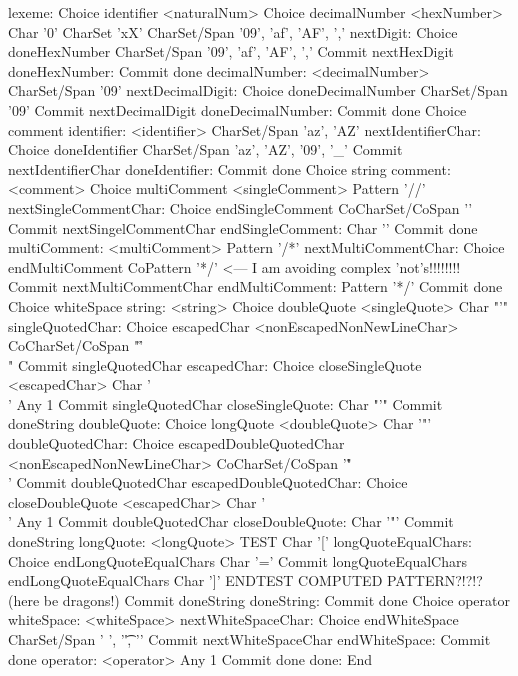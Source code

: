 \starttyping
lexeme:
  Choice identifier
    <naturalNum>
    Choice decimalNumber
      <hexNumber>
      Char '0'
      CharSet 'xX'
      CharSet/Span {'09', 'af', 'AF', ','}
    nextDigit:
      Choice doneHexNumber
      CharSet/Span {'09', 'af', 'AF', ','}
      Commit nextHexDigit
    doneHexNumber:
    Commit done
  decimalNumber:
      <decimalNumber>
      CharSet/Span '09'
    nextDecimalDigit:
      Choice doneDecimalNumber
      CharSet/Span '09'
      Commit nextDecimalDigit
    doneDecimalNumber:
    Commit done
  Choice comment
identifier:
    <identifier>
    CharSet/Span {'az', 'AZ'}
  nextIdentifierChar:
    Choice doneIdentifier
      CharSet/Span {'az', 'AZ', '09', '_'}
      Commit nextIdentifierChar
  doneIdentifier:
    Commit done
  Choice string
comment:
    <comment>
    Choice multiComment
      <singleComment>
      Pattern '//'
    nextSingleCommentChar:
      Choice endSingleComment
      CoCharSet/CoSpan '\n'
      Commit nextSingelCommentChar
    endSingleComment:
      Char '\n'
      Commit done
    multiComment:
      <multiComment>
      Pattern '/*'
    nextMultiCommentChar:
      Choice endMultiComment
      CoPattern '*/'                <--- I am avoiding complex 'not's!!!!!!!!
      Commit nextMultiCommentChar
    endMultiComment:
      Pattern '*/'
      Commit done
  Choice whiteSpace
string:
    <string>
    Choice doubleQuote
      <singleQuote>
      Char "'"
    singleQuotedChar:
      Choice escapedChar
        <nonEscapedNonNewLineChar>
        CoCharSet/CoSpan "'\r\n\f\\"
        Commit singleQuotedChar
      escapedChar:
        Choice closeSingleQuote
        <escapedChar>
        Char '\\'
        Any 1
        Commit singleQuotedChar
      closeSingleQuote:
        Char "'"
      Commit doneString
    doubleQuote:
    Choice longQuote
      <doubleQuote>
      Char '"'
    doubleQuotedChar:
      Choice escapedDoubleQuotedChar
        <nonEscapedNonNewLineChar>
        CoCharSet/CoSpan '"\r\n\f\\'
        Commit doubleQuotedChar
      escapedDoubleQuotedChar:
        Choice closeDoubleQuote
        <escapedChar>
        Char '\\'
        Any 1
        Commit doubleQuotedChar
      closeDoubleQuote:
        Char '"'
      Commit doneString
    longQuote:
      <longQuote>
      TEST
        Char '['
        longQuoteEqualChars:
          Choice endLongQuoteEqualChars
            Char '='
            Commit longQuoteEqualChars
        endLongQuoteEqualChars
        Char ']'
      ENDTEST
      COMPUTED PATTERN?!?!? (here be dragons!)
      Commit doneString
  doneString:
    Commit done
  Choice operator
whiteSpace:
    <whiteSpace>
  nextWhiteSpaceChar:
    Choice endWhiteSpace
    CharSet/Span {' ', '\t', '\n'}
    Commit nextWhiteSpaceChar
  endWhiteSpace:
    Commit done
operator:
    <operator>
    Any 1
    Commit done
done:
  End
\stoptyping

